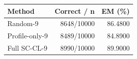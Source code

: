 \begin{tabular}{lrr}
\toprule
Method & Correct / n & EM (\%) \\
\midrule
Random-9 & 8648/10000 & 86.4800 \\
Profile-only-9 & 8489/10000 & 84.8900 \\
Full SC-CL-9 & 8990/10000 & 89.9000 \\
\bottomrule
\end{tabular}
